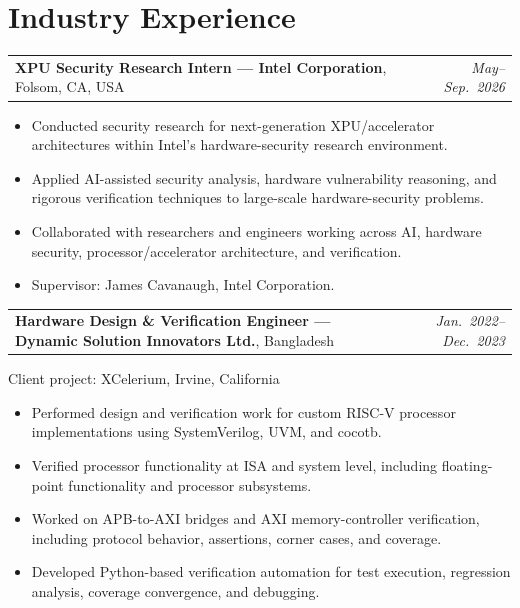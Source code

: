 \documentclass[11pt,letterpaper]{article}
\makeatletter
\newcommand{\entry}[2]{\par\noindent
  \begin{tabularx}{\textwidth}{@{}>{\raggedright\arraybackslash}X@{\hspace{1em}}r@{}}
    #1 & \textit{#2}
  \end{tabularx}\par}
\newcommand{\subnote}[1]{{\color{cvgray}#1}\par}
\makeatother
\begin{document}
\section*{Industry Experience}
\entry{\textbf{XPU Security Research Intern --- Intel Corporation}, Folsom, CA, USA}{May--Sep.\ 2026}
\begin{itemize}
  \item Conducted security research for next-generation XPU/accelerator architectures within Intel's
  hardware-security research environment.
  \item Applied AI-assisted security analysis, hardware vulnerability reasoning, and rigorous
  verification techniques to large-scale hardware-security problems.
  \item Collaborated with researchers and engineers working across AI, hardware security,
  processor/accelerator architecture, and verification.
  \item Supervisor: James Cavanaugh, Intel Corporation.
\end{itemize}
\vspace{4pt}
\entry{\textbf{Hardware Design \& Verification Engineer --- Dynamic Solution Innovators Ltd.}, Bangladesh}{Jan.\ 2022--Dec.\ 2023}
\subnote{Client project: XCelerium, Irvine, California}
\begin{itemize}
  \item Performed design and verification work for custom RISC-V processor implementations using
  SystemVerilog, UVM, and cocotb.
  \item Verified processor functionality at ISA and system level, including floating-point
  functionality and processor subsystems.
  \item Worked on APB-to-AXI bridges and AXI memory-controller verification, including protocol
  behavior, assertions, corner cases, and coverage.
  \item Developed Python-based verification automation for test execution, regression analysis,
  coverage convergence, and debugging.
\end{itemize}

\end{document}
